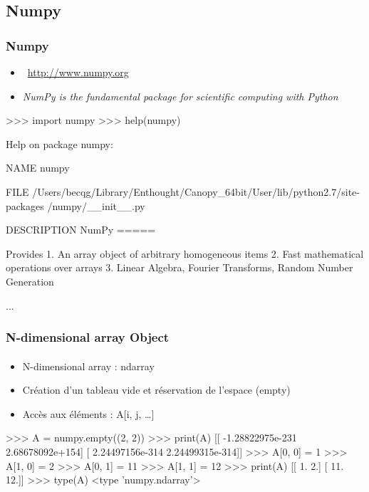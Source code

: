 \subsection{Numpy}
\begin{frame}[fragile]
\frametitle{Numpy}
\begin{itemize}
 \item {} \, \url{http://www.numpy.org}
 \item \emph{NumPy is the fundamental package for scientific computing with Python}
\end{itemize}
\begin{pythonConsole}
>>> import numpy
>>> help(numpy)

Help on package numpy:

NAME
    numpy

FILE
    /Users/becqg/Library/Enthought/Canopy_64bit/User/lib/python2.7/site-packages
    /numpy/__init__.py

DESCRIPTION
    NumPy
    =====
    
    Provides
      1. An array object of arbitrary homogeneous items
      2. Fast mathematical operations over arrays
      3. Linear Algebra, Fourier Transforms, Random Number Generation
    
...
\end{pythonConsole}
\end{frame}
\begin{frame}[fragile]
\frametitle{N-dimensional array Object}
\framesubtitle{}
\begin{itemize}
 \item N-dimensional array : ndarray
 \item Création d'un tableau vide et réservation de l'espace (empty)
 \item Accès aux éléments : A[i, j, \dots]
\end{itemize}
\begin{pythonConsole}

>>> A = numpy.empty((2, 2))
>>> print(A)
[[ -1.28822975e-231   2.68678092e+154]
 [  2.24497156e-314   2.24499315e-314]]
>>> A[0, 0] = 1
>>> A[1, 0] = 2
>>> A[0, 1] = 11
>>> A[1, 1] = 12
>>> print(A)
[[  1.   2.]
 [ 11.  12.]]
>>> type(A)
<type 'numpy.ndarray'>
\end{pythonConsole}
\end{frame}

